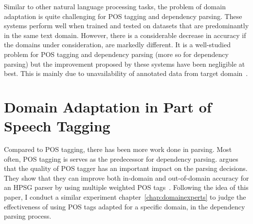  
Similar to other natural language processing tasks, the problem of domain adaptation is quite challenging for POS tagging and dependency parsing. These systems perform well when trained and tested on datasets that are predominantly in the same text domain. However, there is a considerable decrease in accuracy if the domains under consideration, are markedly different. It is a well-studied problem for POS tagging and dependency parsing (more so for dependency parsing) but the improvement proposed by these systems have been negligible at best. This is mainly due to unavailability of annotated data from target domain~\citep{dredze:blitzer:ea:07}. 

\section{Domain Adaptation in Part of Speech Tagging}

Compared to POS tagging, there has been more work done in parsing. Most often, POS tagging is serves as the predecessor for dependency parsing. \cite{yoshida2007ambiguous} argues that the quality of POS tagger has an important impact on the parsing decisions. They show that they can improve both in-domain and out-of-domain accuracy for an HPSG parser by using multiple weighted POS tags~. Following the idea of this paper, I conduct a similar experiment chapter~\ref{chap:domainexperts} to judge the effectiveness of using POS tags adapted for a specific domain, in the dependency parsing process. 

